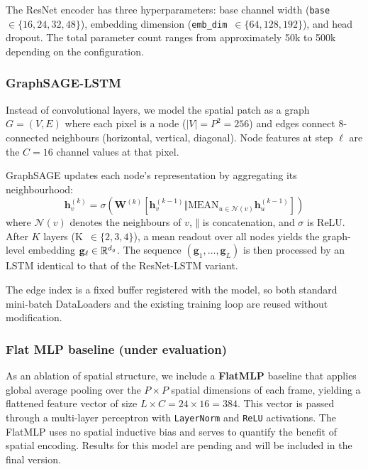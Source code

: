 The ResNet encoder has three hyperparameters: base channel width
(\texttt{base}~$\in\{16, 24, 32, 48\}$), embedding dimension
(\texttt{emb\_dim}~$\in\{64, 128, 192\}$), and head dropout. The total parameter
count ranges from approximately 50k to 500k depending on the configuration.

\subsubsection{GraphSAGE-LSTM}
\label{ssec:gsage}

Instead of convolutional layers, we model the spatial patch as a graph
$G = (V, E)$ where each pixel is a node ($|V| = P^2 = 256$) and edges connect
8-connected neighbours (horizontal, vertical, diagonal). Node features at step $\ell$
are the $C = 16$ channel values at that pixel.

GraphSAGE \cite{hamilton2017} updates each node's representation by aggregating
its neighbourhood:
\begin{equation}
  \mathbf{h}_v^{(k)} = \sigma\!\left(
    \mathbf{W}^{(k)} \left[ \mathbf{h}_v^{(k-1)} \Vert
    \text{MEAN}_{u \in \mathcal{N}(v)} \mathbf{h}_u^{(k-1)} \right]
  \right)
  \label{eq:sage}
\end{equation}
where $\mathcal{N}(v)$ denotes the neighbours of $v$, $\Vert$ is concatenation,
and $\sigma$ is ReLU. After $K$ layers (K~$\in\{2,3,4\}$), a mean readout over
all nodes yields the graph-level embedding $\mathbf{g}_\ell \in \mathbb{R}^{d_g}$.
The sequence $(\mathbf{g}_1, \ldots, \mathbf{g}_L)$ is then processed by an
LSTM identical to that of the ResNet-LSTM variant.

The edge index is a fixed buffer registered with the model, so both standard
mini-batch DataLoaders and the existing training loop are reused without
modification.

\subsubsection{Flat MLP baseline (under evaluation)}
\label{ssec:mlp}

As an ablation of spatial structure, we include a \textbf{FlatMLP} baseline that
applies global average pooling over the $P \times P$ spatial dimensions of each
frame, yielding a flattened feature vector of size $L \times C = 24 \times 16 = 384$.
This vector is passed through a multi-layer perceptron with \texttt{LayerNorm} and
\texttt{ReLU} activations. The FlatMLP uses no spatial inductive bias and serves
to quantify the benefit of spatial encoding. Results for this model are pending
and will be included in the final version.

